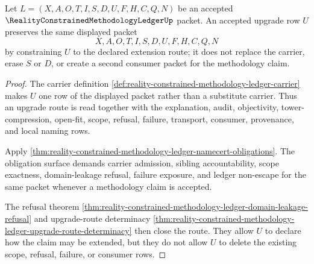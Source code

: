 \begin{theorem}
\label{thm:reality-constrained-methodology-ledger-upgrade-scope-lock}
Let $L=(X,A,O,T,I,S,D,U,F,H,C,Q,N)$ be an accepted $\RealityConstrainedMethodologyLedgerUp$ packet. An accepted upgrade row $U$ preserves the same displayed packet
$$
X,A,O,T,I,S,D,U,F,H,C,Q,N
$$
by constraining $U$ to the declared extension route; it does not replace the carrier, erase $S$ or $D$, or create a second consumer packet for the methodology claim.
\end{theorem}
\begin{proof}
The carrier definition \autoref{def:reality-constrained-methodology-ledger-carrier} makes $U$ one row of the displayed packet rather than a substitute carrier. Thus an upgrade route is read together with the explanation, audit, objectivity, tower-compression, open-fit, scope, refusal, failure, transport, consumer, provenance, and local naming rows.

Apply \autoref{thm:reality-constrained-methodology-ledger-namecert-obligations}. The obligation surface demands carrier admission, sibling accountability, scope exactness, domain-leakage refusal, failure exposure, and ledger non-escape for the same packet whenever a methodology claim is accepted.

The refusal theorem \autoref{thm:reality-constrained-methodology-ledger-domain-leakage-refusal} and upgrade-route determinacy \autoref{thm:reality-constrained-methodology-ledger-upgrade-route-determinacy} then close the route. They allow $U$ to declare how the claim may be extended, but they do not allow $U$ to delete the existing scope, refusal, failure, or consumer rows.
\end{proof}

